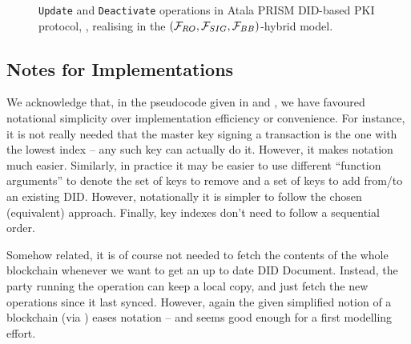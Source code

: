 \begin{figure}[ht!]
\begin{framed}
{\begin{minipage}[t]{0.55\textwidth}
{        }
      \end{minipage}
    }
  \end{framed}
  \caption{\texttt{Update} and \texttt{Deactivate} operations in Atala
    PRISM DID-based PKI protocol, \RealPKIDIDAtala, realising \IdealFPKIDID
    in the $(\mathcal{F}_{RO},\mathcal{F}_{SIG},\mathcal{F}_{BB})$-hybrid model.}
  \label{fig:atalapkidid2}
\end{figure}

\subsection{Notes for Implementations}

We acknowledge that, in the pseudocode given in  and
, we have favoured notational simplicity over
implementation efficiency or
convenience. For instance, it is not really needed that the master key signing a
transaction is the one with the lowest index -- any such key can actually do it.
However, it makes notation much easier. Similarly, in practice it may be easier
to use different ``function arguments'' to denote the set of keys to remove and
a set of keys to add from/to an existing DID. However, notationally it is
simpler to follow the chosen (equivalent) approach. Finally, key indexes don't
need to follow a sequential order.

Somehow related, it is of course not needed to fetch the contents of the whole
blockchain whenever we want to get an up to date DID Document. Instead, the
party running the operation can keep a local copy, and just fetch the new
operations since it last synced. However, again the given simplified notion of
a blockchain (via \IdealFaobb) eases notation -- and seems good enough for a
first modelling effort.


